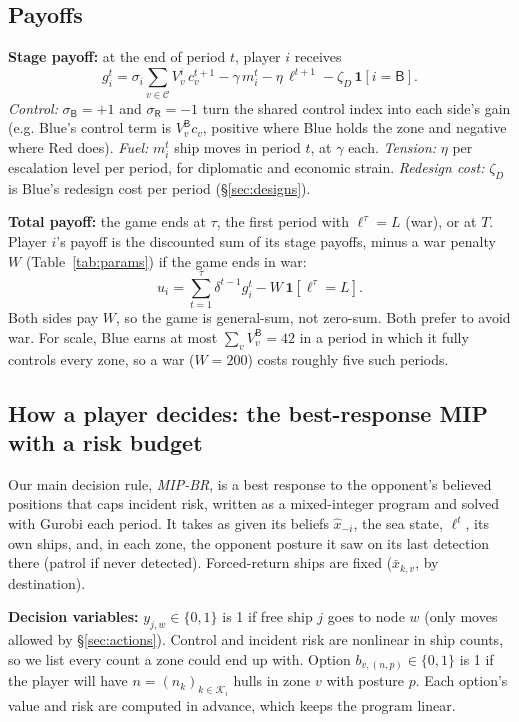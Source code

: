 \documentclass[10pt]{article}
\newcommand{\C}{\mathcal{C}}
\newcommand{\K}{\mathcal{K}}
\newcommand{\1}{\mathbf{1}}
\newcommand{\B}{\mathsf{B}}
\newcommand{\Rd}{\mathsf{R}}
\begin{document}
\subsection{Payoffs}\label{sec:payoffs}
\textbf{Stage payoff:} at the end of period $t$, player $i$ receives
\begin{equation}
g_i^t=\sigma_i\textstyle\sum_{v\in\C}V^i_v\,c^{t+1}_v-\gamma\,m^t_i-\eta\,\ell^{t+1}-\zeta_D\,\1[i=\B].\label{eq:stage}
\end{equation}
\emph{Control:} $\sigma_\B=+1$ and $\sigma_\Rd=-1$ turn the shared control index into each side's gain (e.g.
Blue's control term is $V^\B_v c_v$, positive where Blue holds the zone and negative where Red does).
\emph{Fuel:} $m^t_i$ ship moves in period $t$, at $\gamma$ each.
\emph{Tension:} $\eta$ per escalation level per period, for diplomatic and economic strain.
\emph{Redesign cost:} $\zeta_D$ is Blue's redesign cost per period (\S\ref{sec:designs}).

\textbf{Total payoff:} the game ends at $\tau$, the first period with $\ell^\tau=L$ (war), or at $T$. Player $i$'s
payoff is the discounted sum of its stage payoffs, minus a war penalty $W$ (Table~\ref{tab:params}) if the game ends in war:
\begin{equation}
u_i=\sum_{t=1}^{\tau}\delta^{t-1}g_i^t-W\,\1[\ell^\tau=L].\label{eq:payoff}
\end{equation}
Both sides pay $W$, so the game is general-sum, not zero-sum. Both prefer to avoid war. For scale,
Blue earns at most $\sum_vV^\B_v=42$ in a period in which it fully controls every zone, so a war ($W=200$) costs roughly five such periods.

\subsection{How a player decides: the best-response MIP with a risk budget}\label{sec:mip}
Our main decision rule, \emph{MIP-BR}, is a best response to the opponent's believed positions that caps incident
risk, written as a mixed-integer program and solved with Gurobi each period. It takes as given its beliefs
$\hat x_{-i}$, the sea state, $\ell^t$, its own ships, and, in each zone, the opponent posture it saw on its last
detection there (patrol if never detected). Forced-return ships are fixed ($\bar x_{k,v}$, by destination).

\textbf{Decision variables:} $y_{j,w}\in\{0,1\}$ is 1 if free ship $j$ goes to node $w$ (only moves allowed by
\S\ref{sec:actions}). Control and incident risk are nonlinear in ship counts, so we list every count a zone could
end up with. Option $b_{v,(n,p)}\in\{0,1\}$ is 1 if the player will have $n=(n_k)_{k\in\K_i}$ hulls in zone $v$ with posture
$p$. Each option's value and risk are computed in advance, which keeps the program linear.
\end{document}
